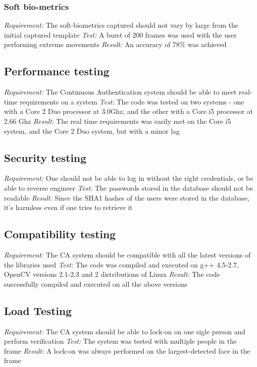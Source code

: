 \documentclass[12pt]{article}			%
\begin{document}
\subsubsection{ Soft bio-metrics }
\emph{ Requirement: } The soft-biometrics captured should not vary by large from the initial captured template
\emph{ Test: } A burst of 200 frames was used with the user performing extreme movements
\emph{ Result: } An accuracy of 78\% was achieved

\subsection{ Performance testing } 
\emph{ Requirement: } The Continuous Authentication system should be able to meet real-time requirements on a system
\emph{ Test: } The code was tested on two systems - one with a Core 2 Duo processor at 3.0Ghz, and the other with a Core i5 processor at 2.66 Ghz
\emph{ Result: } The real time requirements was easily met on the Core i5 system, and the Core 2 Duo system, but with a minor lag

\subsection{ Security testing}
\emph{ Requirement: } One should not be able to log in without the right credentials, or be able to reverse engineer
\emph{ Test: } The passwords stored in the database should not be readable
\emph{ Result: } Since the SHA1 hashes of the users were stored in the database, it's harmless even if one tries to retrieve it

\subsection{ Compatibility testing }
\emph{ Requirement: } The CA system should be compatible with all the latest versions of the libraries used
\emph{ Test: } The code was compiled and executed on g++ 4.5-2.7, OpenCV versions 2.1-2.3 and 2 distributions of Linux
\emph{ Result: } The code successfully compiled and executed on all the above versions

\subsection{ Load Testing }
\emph{ Requirement: } The CA system should be able to lock-on on one sigle person and perform verification 
\emph{ Test: } The system was tested with multiple people in the frame
\emph{ Result: } A lock-on was always performed on the largest-detected face in the frame
\end{document}

